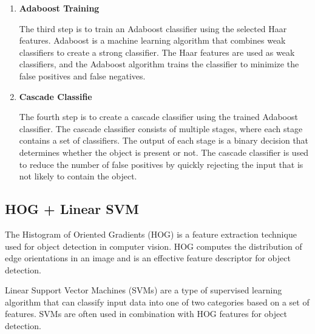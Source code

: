 \begin{enumerate}
            where $P(i,j)$ is the value of the pixel at location $(i,j)$. This cumulative sum includes the value of the pixel at $(x,y)$ itself, as well as all the pixels to its left and above it.
            In figure \ref{fig:integral_image_example}, there is example of how a integral image will look like.

            \begin{linfigure}{fig:integral_image_example}{Example of how intergral images works}
                \texttt{[image: integral\_image\_example]}
            \end{linfigure}
            
            \item \textbf{Adaboost Training}
        
            The third step is to train an Adaboost classifier using the selected Haar features. 
            Adaboost is a machine learning algorithm that combines weak classifiers to create a strong classifier. 
            The Haar features are used as weak classifiers, and the Adaboost algorithm trains the classifier to minimize the false positives and false negatives.
        
            \item \textbf{Cascade Classifie}
        
            The fourth step is to create a cascade classifier using the trained Adaboost classifier. 
            The cascade classifier consists of multiple stages, where each stage contains a set of classifiers. 
            The output of each stage is a binary decision that determines whether the object is present or not. 
            The cascade classifier is used to reduce the number of false positives by quickly rejecting the input that is not likely to contain the object.

        \end{enumerate}

    \subsection{HOG + Linear SVM}
    The Histogram of Oriented Gradients (HOG) is a feature extraction technique used for object detection in computer vision. 
    HOG computes the distribution of edge orientations in an image and is an effective feature descriptor for object detection.

    Linear Support Vector Machines (SVMs) are a type of supervised learning algorithm that can classify input data into one of two categories based on a set of features. 
    SVMs are often used in combination with HOG features for object detection.
    \cite{hgms:hog-multiscale}

